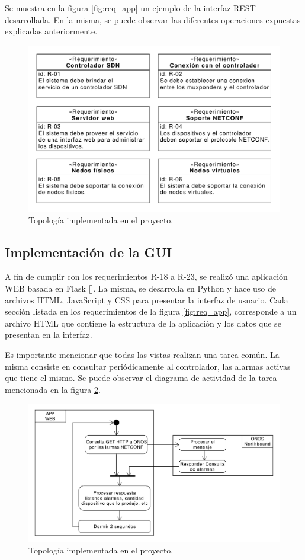 Se muestra en la figura \ref{fig:req_app} un ejemplo de la interfaz REST desarrollada. En la misma, se puede observar las diferentes operaciones expuestas explicadas anteriormente.

\begin{figure}[H]
    \centering
    \includegraphics[scale=0.65]{Figures/req_sys.pdf}
    \caption{Topología implementada en el proyecto.}
    \label{fig:req_sys}
  \end{figure}


  \subsection{Implementación de la GUI}
  A fin de cumplir con los requerimientos R-18 a R-23, se realizó una aplicación WEB basada en Flask []. La misma, se desarrolla en Python y hace uso de archivos HTML, JavaScript y CSS para presentar la interfaz de usuario. Cada sección listada en los requerimientos de la figura \ref{fig:req_app}, corresponde a un archivo HTML que contiene la estructura de la aplicación y los datos que se presentan en la interfaz. 

Es importante mencionar que todas las vistas realizan una tarea común. La misma consiste en consultar periódicamente al controlador, las alarmas activas que tiene el mismo. Se puede observar el diagrama de actividad de la tarea mencionada en la figura \ref{fig:consulta_alarmas}.

\begin{figure}[H]
    \centering
    \includegraphics[scale=0.45]{Figures/consulta_alarmas.pdf}
    \caption{Topología implementada en el proyecto.}
    \label{fig:consulta_alarmas}
  \end{figure}

